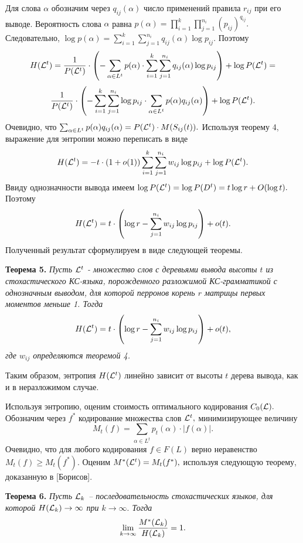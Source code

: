 \documentclass[12pt,russian]{article}
\begin{document}
{Для слова $\alpha$ обозначим через $q_{ij}(\alpha)$ число применений правила $r_{ij}$ при его выводе. Вероятность слова $\alpha$ равна
$p(\alpha)=\prod_{i=1}^k \prod_{j=1}^{n_i} (p_{ij})^{q_{ij}}.$ Следовательно, $\log p(\alpha)= \sum_{i=1}^k \sum_{j=1}^{n_i} q_{ij}(\alpha) \log p_{ij}.$ Поэтому 
$$
H({\cal L}^t) = \frac{1}{P({\cal L}^t)} \cdot \left( -\sum_{\alpha \in L^t} p(\alpha) \cdot \sum_{i=1}^k \sum_{j=1}^{n_i} q_{ij}(\alpha) \log p_{ij} \right)+ \log P({\cal L}^t)=
$$
$$
\frac{1}{P({\cal L}^t)} \cdot \left( - \sum_{i=1}^k \sum_{j=1}^{n_i} \log p_{ij} \cdot \sum_{\alpha \in L^t} p(\alpha) q_{ij}(\alpha)  \right)+ 
\log P({\cal L}^t).
$$
Очевидно, что $\sum_{\alpha \in L^t} p(\alpha) q_{ij}(\alpha) = {P({\cal L}^t)}\cdot M(S_{ij}(t)).$
Используя теорему 4, выражение для энтропии можно переписать в виде
$$
H({\cal L}^t) = -t\cdot (1+o(1))\sum_{i=1}^k \sum_{j=1}^{n_i} w_{ij}\log p_{ij} + 
\log P({\cal L}^t).
$$
Ввиду однозначности вывода имеем $\log P({\cal L}^t)=\log P(D^t)=t \log r+O(\log t).$ Поэтому 
$$
H({\cal L}^t) =t \cdot \left( \log r - \sum_{j=1}^{n_i} w_{ij}\log p_{ij}\right)+o(t).
$$
Полученный результат сформулируем в виде следующей теоремы.

\medskip

{\bf Теорема 5.}
{\em
Пусть ${\cal L}^t$ - множество слов с деревьями вывода высоты $t$ из стохастического КС-языка, порожденного разложимой КС-гра\-м\-ма\-ти\-кой
с однозначным выводом, для которой перронов корень $r$ матрицы первых моментов меньше 1. Тогда
$$
H({\cal L}^t) =t \cdot \left( \log r - \sum_{j=1}^{n_i} w_{ij}\log p_{ij}\right)+o(t),
$$
где $w_{ij}$ определяются теоремой 4.
}

Таким образом, энтропия $H({\cal L}^t)$ линейно зависит от высоты $t$ дерева вывода, как и в неразложимом случае.

\medskip

Используя энтропию, оценим стоимость оптимального кодирования $C_0({\cal L}).$
Обозначим через $f^*$ кодирование множества слов ${\cal L}^t,$ минимизирующее величину 
$$
M_t(f)=\sum_{\alpha \in L^t} p_t(\alpha)\cdot \left|f(\alpha)\right|.
$$
Очевидно, что для любого кодирования $f \in F(L)$ верно неравенство $M_t(f) \ge M_t(f^*).$ Оценим  $M^*({\cal L}^t)=M_t(f^*),$ используя следующую теорему, доказанную в [Борисов].

\medskip

{\bf Теорема 6.}
{\em Пусть ${\cal L}_k$ -- последовательность стохастических языков, для которой $H({\cal L}_k) \rightarrow \infty$ при $k \rightarrow \infty.$ Тогда 
$$
\lim_{k \rightarrow \infty} \frac{M^*({\cal L}_k)}{H({\cal L}_k)}=1.
$$ 
}
\medskip

}
\end{document}
